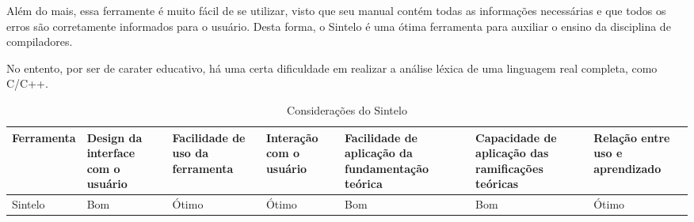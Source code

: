 Além do mais, essa ferramente é muito fácil de se utilizar, visto que seu manual contém todas as informações necessárias e que todos os erros são corretamente informados para o usuário. Desta forma, o Sintelo é uma ótima ferramenta para auxiliar o ensino da disciplina de compiladores.

No entento, por ser de carater educativo, há uma certa dificuldade em realizar a análise léxica de uma linguagem real completa, como C/C++.

\begin{table}[ht]
\caption{Considerações do Sintelo}
\centering
\begin{tabular}{|m{1.6cm}|m{1.5cm}|m{1.5cm}|m{1.5cm}|m{1.5cm}|m{1.8cm}|m{1.5cm}|}  \hline
   Ferramenta & Design da interface com o usuário & Facilidade de uso da ferramenta & Interação com o usuário & Facilidade de aplicação da fundamentação teórica & Capacidade de aplicação das ramificações teóricas & Relação entre uso e aprendizado \\ \hline
Sintelo & Bom & Ótimo & Ótimo &  Bom & Bom & Ótimo \\ \hline
\end{tabular}
\label{table:caracteristicas_sintelo}
\end{table}


